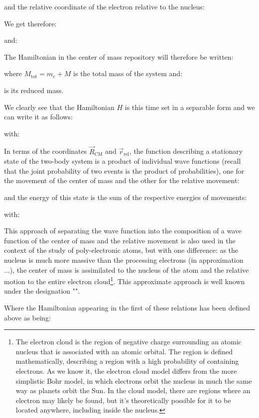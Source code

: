 	and the relative coordinate of the electron relative to the nucleus:
	
	We get therefore:
	
	and:
	
	The Hamiltonian in the center of mass repository will therefore be written:
	
	where $M_{\text{tot}}=m_e+M$ is the total mass of the system and:
	
	is its reduced mass.
	
	We clearly see that the Hamiltonian $H$ is this time set in a separable form and we can write it as follows:
	
	with:
	
	In terms of the coordinates $\vec{R}_{\text{CM}}$ and $\vec{r}_{\text{rel}}$, the function describing a stationary state of the two-body system is a product of individual wave functions (recall that the joint probability of two events is the product of probabilities), one for the movement of the center of mass and the other for the relative movement:
	
	and the energy of this state is the sum of the respective energies of movements:
	
	with:
	
	\begin{tcolorbox}[title=Remark,colframe=black,arc=10pt]
	This approach of separating the wave function into the composition of a wave function of the center of mass and the relative movement is also used in the context of the study of poly-electronic atoms, but with one difference: as the nucleus is much more massive than the processing electrons (in approximation ...), the center of mass is assimilated to the nucleus of the atom and the relative motion to the entire electron cloud\footnote{The electron cloud is the region of negative charge surrounding an atomic nucleus that is associated with an atomic orbital. The region is defined mathematically, describing a region with a high probability of containing electrons. As we know it, the electron cloud model differs from the more simplistic Bohr model, in which electrons orbit the nucleus in much the same way as planets orbit the Sun. In the cloud model, there are regions where an electron may likely be found, but it's theoretically possible for it to be located anywhere, including inside the nucleus.}. This approximate approach is well known under the designation "".
	\end{tcolorbox}
	Where the Hamiltonian appearing in the first of these relations has been defined above as being:
	
